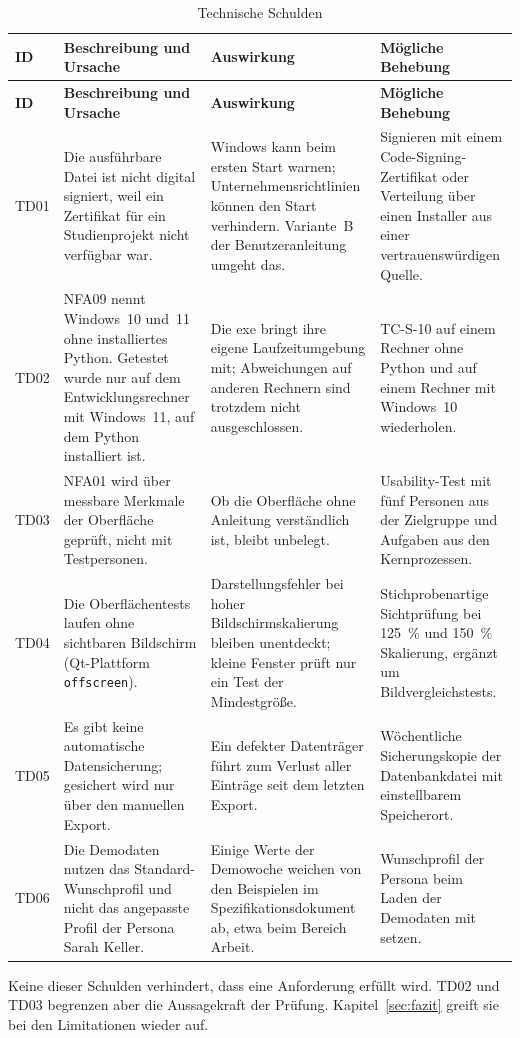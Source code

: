 \begingroup
{}
\fontsize{10pt}{12pt}\selectfont
\begin{longtable}{@{}L{1.0cm}L{4.4cm}L{5.1cm}L{5.1cm}@{}}
  \caption{Technische Schulden}\label{tab:schulden}\\
  \toprule
  \textbf{ID} & \textbf{Beschreibung und Ursache} & \textbf{Auswirkung} & \textbf{Mögliche Behebung} \\
  \midrule
  \endfirsthead
  \toprule
  \textbf{ID} & \textbf{Beschreibung und Ursache} & \textbf{Auswirkung} & \textbf{Mögliche Behebung} \\
  \midrule
  \endhead
  \bottomrule
  \endfoot
  TD01 & Die ausführbare Datei ist nicht digital signiert, weil ein Zertifikat für ein Studienprojekt nicht verfügbar war. & Windows kann beim ersten Start warnen; Unternehmensrichtlinien können den Start verhindern. Variante~B der Benutzeranleitung umgeht das. & Signieren mit einem Code-Signing-Zertifikat oder Verteilung über einen Installer aus einer vertrauenswürdigen Quelle. \\
  TD02 & NFA09 nennt Windows~10 und~11 ohne installiertes Python. Getestet wurde nur auf dem Entwicklungsrechner mit Windows~11, auf dem Python installiert ist. & Die exe bringt ihre eigene Laufzeitumgebung mit; Abweichungen auf anderen Rechnern sind trotzdem nicht ausgeschlossen. & TC-S-10 auf einem Rechner ohne Python und auf einem Rechner mit Windows~10 wiederholen. \\
  TD03 & NFA01 wird über messbare Merkmale der Oberfläche geprüft, nicht mit Testpersonen. & Ob die Oberfläche ohne Anleitung verständlich ist, bleibt unbelegt. & Usability-Test mit fünf Personen aus der Zielgruppe und Aufgaben aus den Kernprozessen. \\
  TD04 & Die Oberflächentests laufen ohne sichtbaren Bildschirm (Qt-Plattform \texttt{offscreen}). & Darstellungsfehler bei hoher Bildschirmskalierung bleiben unentdeckt; kleine Fenster prüft nur ein Test der Mindestgröße. & Stichprobenartige Sichtprüfung bei 125~\% und 150~\% Skalierung, ergänzt um Bildvergleichstests. \\
  TD05 & Es gibt keine automatische Datensicherung; gesichert wird nur über den manuellen Export. & Ein defekter Datenträger führt zum Verlust aller Einträge seit dem letzten Export. & Wöchentliche Sicherungskopie der Datenbankdatei mit einstellbarem Speicherort. \\
  TD06 & Die Demodaten nutzen das Standard-Wunschprofil und nicht das angepasste Profil der Persona Sarah Keller. & Einige Werte der Demowoche weichen von den Beispielen im Spezifikationsdokument ab, etwa beim Bereich Arbeit. & Wunschprofil der Persona beim Laden der Demodaten mit setzen. \\
\end{longtable}
\endgroup
{}

Keine dieser Schulden verhindert, dass eine Anforderung erfüllt wird. TD02 und TD03 begrenzen aber die Aussagekraft der Prüfung. Kapitel~\ref{sec:fazit} greift sie bei den Limitationen wieder auf.
